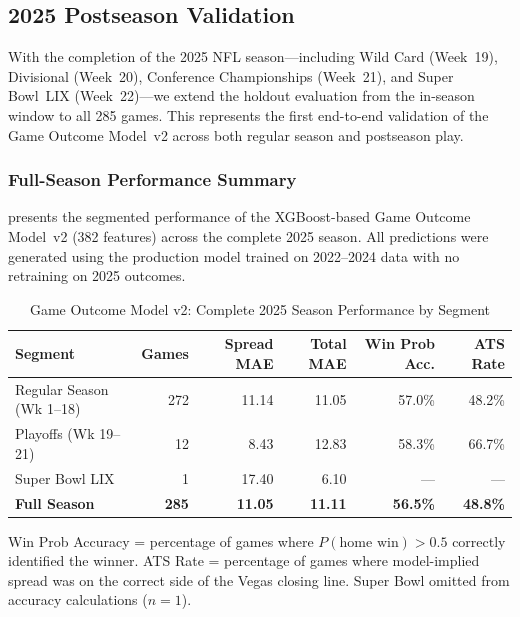 \subsection{2025 Postseason Validation}\label{subsec:postseason-validation}

With the completion of the 2025 NFL season---including Wild Card (Week~19), Divisional (Week~20), Conference Championships (Week~21), and Super Bowl~LIX (Week~22)---we extend the holdout evaluation from the in-season window to all 285 games. This represents the first end-to-end validation of the Game Outcome Model~v2 across both regular season and postseason play.

\subsubsection{Full-Season Performance Summary}

 presents the segmented performance of the XGBoost-based Game Outcome Model~v2 (382 features) across the complete 2025 season. All predictions were generated using the production model trained on 2022--2024 data with no retraining on 2025 outcomes.

\begin{table}[htbp]
\centering
\small
\caption{Game Outcome Model v2: Complete 2025 Season Performance by Segment}
\label{tab:full-season-2025}
\footnotesize
\setlength{\tabcolsep}{3pt}
\begin{tabular}{@{}lrrrrr@{}}
\toprule
\textbf{Segment} & \textbf{Games} & \textbf{Spread MAE} & \textbf{Total MAE} & \textbf{Win Prob Acc.} & \textbf{ATS Rate} \\
\midrule
Regular Season (Wk 1--18) & 272 & 11.14 & 11.05 & 57.0\% & 48.2\% \\
Playoffs (Wk 19--21) & 12 & 8.43 & 12.83 & 58.3\% & 66.7\% \\
Super Bowl LIX & 1 & 17.40 & 6.10 & --- & --- \\
\midrule
\textbf{Full Season} & \textbf{285} & \textbf{11.05} & \textbf{11.11} & \textbf{56.5\%} & \textbf{48.8\%} \\
\bottomrule
\end{tabular}
\begin{tablenotes}
\item Win Prob Accuracy = percentage of games where $P(\text{home win}) > 0.5$ correctly identified the winner. ATS Rate = percentage of games where model-implied spread was on the correct side of the Vegas closing line. Super Bowl omitted from accuracy calculations ($n=1$).
\end{tablenotes}
\end{table}

